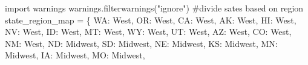 \documentclass[
  letterpaper,
  DIV=11,
  numbers=noendperiod]{scrartcl}
\newenvironment{Shaded}{\begin{snugshade}}{\end{snugshade}}
\newcommand{\CommentTok}[1]{\textcolor[rgb]{0.37,0.37,0.37}{#1}}
\newcommand{\ImportTok}[1]{\textcolor[rgb]{0.00,0.46,0.62}{#1}}
\newcommand{\NormalTok}[1]{\textcolor[rgb]{0.00,0.23,0.31}{#1}}
\newcommand{\OperatorTok}[1]{\textcolor[rgb]{0.37,0.37,0.37}{#1}}
\newcommand{\StringTok}[1]{\textcolor[rgb]{0.13,0.47,0.30}{#1}}
\begin{document}
\begin{Shaded}
\begin{Highlighting}[]
\ImportTok{import}\NormalTok{ warnings}
\NormalTok{warnings.filterwarnings(}\StringTok{"ignore"}\NormalTok{)}
\CommentTok{\#divide sates based on region}
\NormalTok{state\_region\_map }\OperatorTok{=}\NormalTok{ \{}
    \StringTok{\textquotesingle{}WA\textquotesingle{}}\NormalTok{: }\StringTok{\textquotesingle{}West\textquotesingle{}}\NormalTok{, }\StringTok{\textquotesingle{}OR\textquotesingle{}}\NormalTok{: }\StringTok{\textquotesingle{}West\textquotesingle{}}\NormalTok{, }\StringTok{\textquotesingle{}CA\textquotesingle{}}\NormalTok{: }\StringTok{\textquotesingle{}West\textquotesingle{}}\NormalTok{, }\StringTok{\textquotesingle{}AK\textquotesingle{}}\NormalTok{: }\StringTok{\textquotesingle{}West\textquotesingle{}}\NormalTok{, }\StringTok{\textquotesingle{}HI\textquotesingle{}}\NormalTok{: }\StringTok{\textquotesingle{}West\textquotesingle{}}\NormalTok{, }\StringTok{\textquotesingle{}NV\textquotesingle{}}\NormalTok{: }\StringTok{\textquotesingle{}West\textquotesingle{}}\NormalTok{, }\StringTok{\textquotesingle{}ID\textquotesingle{}}\NormalTok{: }\StringTok{\textquotesingle{}West\textquotesingle{}}\NormalTok{,}
    \StringTok{\textquotesingle{}MT\textquotesingle{}}\NormalTok{: }\StringTok{\textquotesingle{}West\textquotesingle{}}\NormalTok{, }\StringTok{\textquotesingle{}WY\textquotesingle{}}\NormalTok{: }\StringTok{\textquotesingle{}West\textquotesingle{}}\NormalTok{, }\StringTok{\textquotesingle{}UT\textquotesingle{}}\NormalTok{: }\StringTok{\textquotesingle{}West\textquotesingle{}}\NormalTok{, }\StringTok{\textquotesingle{}AZ\textquotesingle{}}\NormalTok{: }\StringTok{\textquotesingle{}West\textquotesingle{}}\NormalTok{, }\StringTok{\textquotesingle{}CO\textquotesingle{}}\NormalTok{: }\StringTok{\textquotesingle{}West\textquotesingle{}}\NormalTok{, }\StringTok{\textquotesingle{}NM\textquotesingle{}}\NormalTok{: }\StringTok{\textquotesingle{}West\textquotesingle{}}\NormalTok{,}
    \StringTok{\textquotesingle{}ND\textquotesingle{}}\NormalTok{: }\StringTok{\textquotesingle{}Midwest\textquotesingle{}}\NormalTok{, }\StringTok{\textquotesingle{}SD\textquotesingle{}}\NormalTok{: }\StringTok{\textquotesingle{}Midwest\textquotesingle{}}\NormalTok{, }\StringTok{\textquotesingle{}NE\textquotesingle{}}\NormalTok{: }\StringTok{\textquotesingle{}Midwest\textquotesingle{}}\NormalTok{, }\StringTok{\textquotesingle{}KS\textquotesingle{}}\NormalTok{: }\StringTok{\textquotesingle{}Midwest\textquotesingle{}}\NormalTok{, }\StringTok{\textquotesingle{}MN\textquotesingle{}}\NormalTok{: }\StringTok{\textquotesingle{}Midwest\textquotesingle{}}\NormalTok{, }\StringTok{\textquotesingle{}IA\textquotesingle{}}\NormalTok{: }\StringTok{\textquotesingle{}Midwest\textquotesingle{}}\NormalTok{, }\StringTok{\textquotesingle{}MO\textquotesingle{}}\NormalTok{: }\StringTok{\textquotesingle{}Midwest\textquotesingle{}}\NormalTok{,}

\end{Highlighting}
\end{Shaded}
\end{document}
